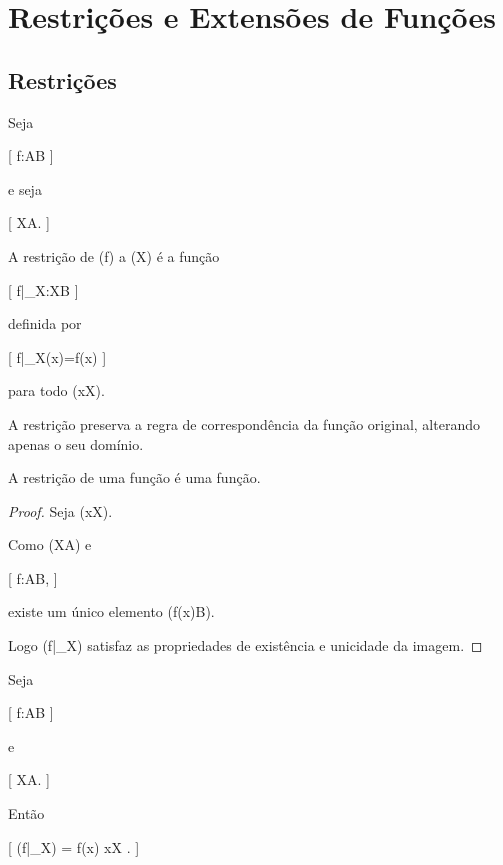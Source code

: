 \section{Restrições e Extensões de Funções}
\label{sec:matematica:funcoes:restricoes-e-extensoes}

\subsection{Restrições}

\begin{defn}
	\label{def:matematica:funcoes:restricoes-e-extensoes:restricao}

	Seja

		[
			f:A\to B
		]

	e seja

		[
			X\subseteq A.
		]

	A restrição de (f) a (X) é a função

	[
	f|_X:X\to B
	]

	definida por

		[
			f|_X(x)=f(x)
		]

	para todo (x\in X).

\end{defn}

\begin{obs}

	A restrição preserva a regra de correspondência da função original,
	alterando apenas o seu domínio.

\end{obs}

\begin{prop}
	\label{prop:matematica:funcoes:restricoes-e-extensoes:restricao-funcao}

	A restrição de uma função é uma função.

\end{prop}

\begin{proof}

	Seja (x\in X).

	Como (X\subseteq A) e

		[
			f:A\to B,
		]

	existe um único elemento (f(x)\in B).

	Logo (f|_X) satisfaz as propriedades de existência e unicidade da
	imagem.

\end{proof}

\begin{prop}
	\label{prop:matematica:funcoes:restricoes-e-extensoes:restricao-imagem}

	Seja

		[
			f:A\to B
		]

	e

		[
			X\subseteq A.
		]

	Então

	[
	(f|_X)
		=
		{
			f(x)
			\mid
			x\in X
		}.
	]

\end{prop}

